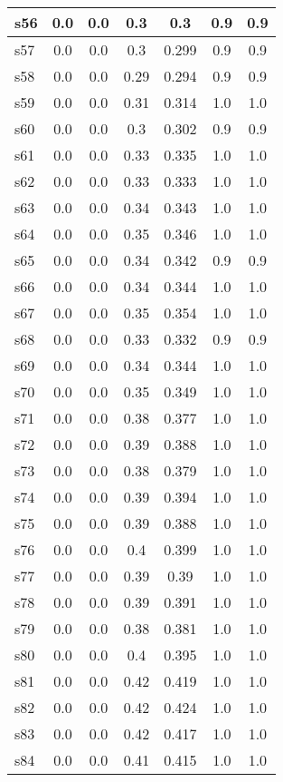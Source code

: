 \documentclass{article}
\begin{document}
\begin{tabular}{|l|c|c|c|c|c|c|}
\hline
s56 &0.0 & 0.0 & 0.3 & 0.3 & 0.9 & 0.9\\
\hline
s57 &0.0 & 0.0 & 0.3 & 0.299 & 0.9 & 0.9\\
\hline
s58 &0.0 & 0.0 & 0.29 & 0.294 & 0.9 & 0.9\\
\hline
s59 &0.0 & 0.0 & 0.31 & 0.314 & 1.0 & 1.0\\
\hline
s60 &0.0 & 0.0 & 0.3 & 0.302 & 0.9 & 0.9\\
\hline
s61 &0.0 & 0.0 & 0.33 & 0.335 & 1.0 & 1.0\\
\hline
s62 &0.0 & 0.0 & 0.33 & 0.333 & 1.0 & 1.0\\
\hline
s63 &0.0 & 0.0 & 0.34 & 0.343 & 1.0 & 1.0\\
\hline
s64 &0.0 & 0.0 & 0.35 & 0.346 & 1.0 & 1.0\\
\hline
s65 &0.0 & 0.0 & 0.34 & 0.342 & 0.9 & 0.9\\
\hline
s66 &0.0 & 0.0 & 0.34 & 0.344 & 1.0 & 1.0\\
\hline
s67 &0.0 & 0.0 & 0.35 & 0.354 & 1.0 & 1.0\\
\hline
s68 &0.0 & 0.0 & 0.33 & 0.332 & 0.9 & 0.9\\
\hline
s69 &0.0 & 0.0 & 0.34 & 0.344 & 1.0 & 1.0\\
\hline
s70 &0.0 & 0.0 & 0.35 & 0.349 & 1.0 & 1.0\\
\hline
s71 &0.0 & 0.0 & 0.38 & 0.377 & 1.0 & 1.0\\
\hline
s72 &0.0 & 0.0 & 0.39 & 0.388 & 1.0 & 1.0\\
\hline
s73 &0.0 & 0.0 & 0.38 & 0.379 & 1.0 & 1.0\\
\hline
s74 &0.0 & 0.0 & 0.39 & 0.394 & 1.0 & 1.0\\
\hline
s75 &0.0 & 0.0 & 0.39 & 0.388 & 1.0 & 1.0\\
\hline
s76 &0.0 & 0.0 & 0.4 & 0.399 & 1.0 & 1.0\\
\hline
s77 &0.0 & 0.0 & 0.39 & 0.39 & 1.0 & 1.0\\
\hline
s78 &0.0 & 0.0 & 0.39 & 0.391 & 1.0 & 1.0\\
\hline
s79 &0.0 & 0.0 & 0.38 & 0.381 & 1.0 & 1.0\\
\hline
s80 &0.0 & 0.0 & 0.4 & 0.395 & 1.0 & 1.0\\
\hline
s81 &0.0 & 0.0 & 0.42 & 0.419 & 1.0 & 1.0\\
\hline
s82 &0.0 & 0.0 & 0.42 & 0.424 & 1.0 & 1.0\\
\hline
s83 &0.0 & 0.0 & 0.42 & 0.417 & 1.0 & 1.0\\
\hline
s84 &0.0 & 0.0 & 0.41 & 0.415 & 1.0 & 1.0\\

\end{tabular}
\end{document}
